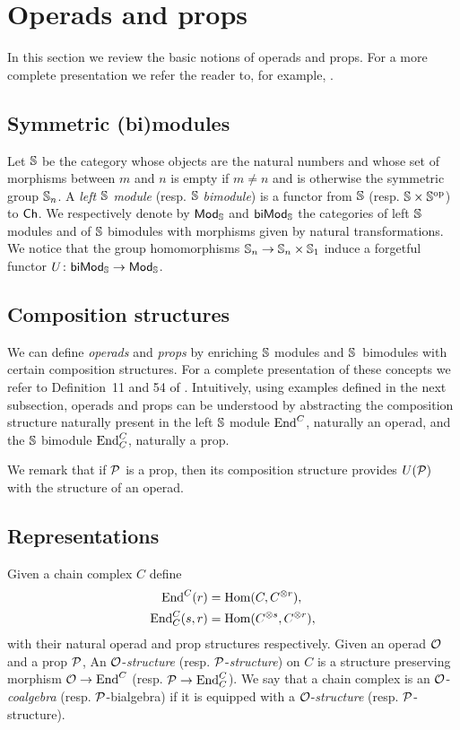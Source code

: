 
\section{Operads and props} \label{s:operads and props}

In this section we review the basic notions of operads and props.
For a more complete presentation we refer the reader to, for example, \cite{markl2008props}.

\subsection{Symmetric (bi)modules}

Let $\S$ be the category whose objects are the natural numbers and whose set of morphisms between $m$ and $n$ is empty if $m \neq n$ and is otherwise the symmetric group $\S_n$.
A \textit{left $\S$ module} (resp. $\S$ \textit{bimodule}) is a functor from $\S$ (resp. $\S \times \S^\op$) to $\Ch$.
We respectively denote by $\smod$ and $\sbimod$ the categories of left $\S$ modules and of $\S$ bimodules with morphisms given by natural transformations.
We notice that the group homomorphisms $\S_n \to \S_n \times \S_1$ induce a forgetful functor $U \colon \sbimod \to \smod$.

\subsection{Composition structures}

We can define \textit{operads} and \textit{props} by enriching $\S$ modules and \mbox{$\S$ bimodules} with certain composition structures.
For a complete presentation of these concepts we refer to Definition~11 and 54 of \cite{markl2008props}.
Intuitively, using examples defined in the next subsection, operads and props can be understood by abstracting the composition structure naturally present in the left $\S$ module $\End^C$, naturally an operad, and the $\S$ bimodule $\End^C_C$, naturally a prop.

We remark that if $\P$ is a prop, then its composition structure provides $U(\P)$ with the structure of an operad.

\subsection{Representations}

Given a chain complex $C$ define
\begin{align*}
\End^C(r) &= \Hom(C, C^{\otimes r}), \\
\End^C_C(s, r) &= \Hom(C^{\otimes s}, C^{\otimes r}),
\end{align*}
with their natural operad and prop structures respectively.
Given an operad $\O$ and a prop $\P$, An $\O$-\textit{structure} (resp. $\P$-\textit{structure}) on $C$ is a structure preserving morphism $\O \to \End^C$ (resp. $\P \to \End_C^C$).
We say that a chain complex is an $\O$-\textit{coalgebra} (resp. $\P$-bialgebra) if it is equipped with a $\O$-\textit{structure} (resp. $\P$-structure).

